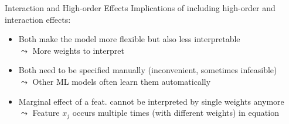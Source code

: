 \documentclass[10pt,compress,t,notes=noshow, xcolor=table]{beamer}
\begin{document}
\begin{frame}{Interaction and High-order Effects}
\pause
\medskip
Implications of including high-order and interaction effects: 
\begin{itemize}
    \item Both make the model more flexible but also less interpretable\\
    $\leadsto$ More weights to interpret
    \item Both need to be specified manually (inconvenient, sometimes infeasible)\\
    $\leadsto$ Other ML models often learn them automatically
    \item Marginal effect of a feat. cannot be interpreted by single weights anymore\\
$\leadsto$ Feature $x_j$ occurs multiple times (with different weights) in equation
\end{itemize}


\end{frame}


\end{document}
